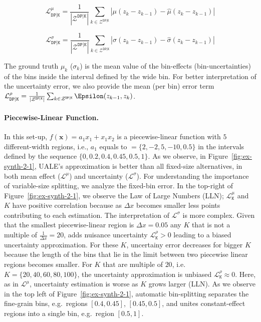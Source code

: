 \documentclass[twoside]{article}
\begin{document}
\begin{equation}
  \label{eq:eval_met_1}
  \mathcal{L}_{\mathtt{DP|K}}^{\mu} = \frac{1}{|\mathcal{Z}^{\mathtt{DP|K}}|} \sum_{k \in
  \mathcal{Z}^{\mathtt{DP|K}}} | \mu(z_k- z_{k-1}) - \hat{\mu}(z_k-
  z_{k-1}) |
\end{equation}


\begin{equation}
  \label{eq:eval_met_2}
  \mathcal{L}_{\mathtt{DP|K}}^{\sigma} = \frac{1}{|\mathcal{Z}^{\mathtt{DP|K}}|} \sum_{k \in
    \mathcal{Z}^{\mathtt{DP|K}}} | \sigma(z_k- z_{k-1}) - \hat{\sigma}(z_k-
  z_{k-1}) |
\end{equation}

The ground truth \(\mu_k\) (\(\sigma_k\)) is the mean value of the
bin-effects (bin-uncertainties) of the bins inside the interval
defined by the wide bin. For better interpretation of the uncertainty
error, we also provide the mean (per bin) error term
\(\mathcal{L}^{\rho}_{\mathtt{DP|K}} =
\frac{1}{|\mathcal{Z}^{\mathtt{DP|K}}|} \sum_{k \in
  \mathcal{Z}^{\mathtt{DP|K}}} \mathcal{\Epsilon}(z_{k-1}, z_k) \).

\paragraph{Piecewise-Linear Function.}

In this set-up, \(f(\mathbf{x}) = a_1x_1 + x_1x_2\) is a
piecewise-linear function with \(5\) different-width regions, i.e.,
\(a_1\) equals to \(=\{2, -2, 5, -10, 0.5\}\) in the intervals defined
by the sequence \(\{0, 0.2, 0.4, 0.45, 0.5, 1\}\). As we observe, in
Figure~\ref{fig:ex-synth-2-1}, UALE's approximation is better than all
fixed-size alternatives, in both mean effect (\(\mathcal{L}^{\mu}\))
and uncertainty (\(\mathcal{L}^{\sigma}\)). For understanding the
importance of variable-size splitting, we analyze the fixed-bin
error. In the top-right of Figure~\ref{fig:ex-synth-2-1}, we observe
the Law of Large Numbers (LLN); \(\mathcal{L}^{\mu}_{\mathtt{K}}\) and
\(K\) have positive correlation because as \(\Delta x\) becomes
smaller less points contributing to each estimation. The
interpretation of \(\mathcal{L}^{\sigma}\) is more complex. Given that
the smallest piecewise-linear region is \(\Delta x = 0.05 \) any
\(K\) that is not a multiple of \(\frac{1}{\Delta x} = 20\), adds
nuisance uncertainty \(\mathcal{L}^{\rho}_{\mathtt{K}} > 0\) leading
to a biased uncertainty approximation. For these \(K\), uncertainy
error decreases for bigger \(K\) because the length of the bins that
lie in the limit between two piecewise linear regions becomes
smaller. For \(K\) that are multiple of \(20\), i.e.
\(K=\{20, 40, 60, 80, 100\}\), the uncertainty approximation is
unbiased \(\mathcal{L}^{\rho}_{\mathtt{K}} \approx 0\). Here, as in
\(\mathcal{L}^{\mu}\), uncertainty estimation is worse as \(K\) grows
larger (LLN). As we observe in the top left of
Figure~\ref{fig:ex-synth-2-1}, automatic bin-splitting separates the
fine-grain bins, e.g.~regions \([0.4, 0.45]\), \([0.45, 0.5]\), and
unites constant-effect regions into a single bin, e.g.~region
\([0.5, 1]\).
\end{document}
